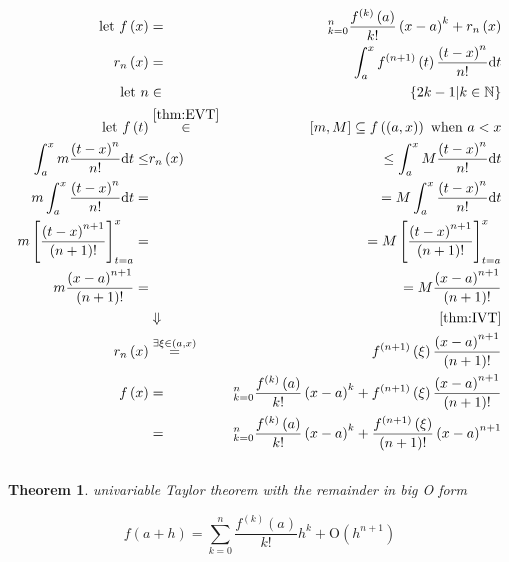 \documentclass[
]{book}
\newtheorem{theorem}{Theorem}[chapter]
\theoremstyle{definition}
\theoremstyle{definition}
\theoremstyle{definition}
\theoremstyle{definition}
\theoremstyle{remark}
\begin{document}
\begin{eqnarray}
\textrm{let }f\left(x\right) & = & \sum_{k=0}^{n}\frac{f^{\left(k\right)}\left(a\right)}{k!}\left(x-a\right)^{k}+r_{n}\left(x\right)\\
r_{n}\left(x\right) & = & \int_{a}^{x}f^{\left(n+1\right)}\left(t\right)\frac{\left(t-x\right)^{n}}{n!}\mathrm{d}t\\
\textrm{let }n & \in & \left\{ 2k-1|k\in\mathbb{N}\right\} \\
\textrm{let }f\left(t\right) & \overset{\ref{thm:EVT}}{\in} & \left[m,M\right]\subseteq f\left(\left(a,x\right)\right)\textrm{ when }a<x\\
\int_{a}^{x}m\frac{\left(t-x\right)^{n}}{n!}\mathrm{d}t\le & r_{n}\left(x\right) & \le\int_{a}^{x}M\frac{\left(t-x\right)^{n}}{n!}\mathrm{d}t\\
m\int_{a}^{x}\frac{\left(t-x\right)^{n}}{n!}\mathrm{d}t= &  & =M\int_{a}^{x}\frac{\left(t-x\right)^{n}}{n!}\mathrm{d}t\\
m\left[\frac{\left(t-x\right)^{n+1}}{\left(n+1\right)!}\right]_{t=a}^{x}= &  & =M\left[\frac{\left(t-x\right)^{n+1}}{\left(n+1\right)!}\right]_{t=a}^{x}\\
m\frac{\left(x-a\right)^{n+1}}{\left(n+1\right)!}= &  & =M\frac{\left(x-a\right)^{n+1}}{\left(n+1\right)!}\\
 & \Downarrow & \ref{thm:IVT}\\
r_{n}\left(x\right) & \overset{\exists\xi\in\left(a,x\right)}{=} & f^{\left(n+1\right)}\left(\xi\right)\frac{\left(x-a\right)^{n+1}}{\left(n+1\right)!}\\
f\left(x\right) & = & \sum_{k=0}^{n}\frac{f^{\left(k\right)}\left(a\right)}{k!}\left(x-a\right)^{k}+f^{\left(n+1\right)}\left(\xi\right)\frac{\left(x-a\right)^{n+1}}{\left(n+1\right)!}\\
 & = & \sum_{k=0}^{n}\frac{f^{\left(k\right)}\left(a\right)}{k!}\left(x-a\right)^{k}+\frac{f^{\left(n+1\right)}\left(\xi\right)}{\left(n+1\right)!}\left(x-a\right)^{n+1}
\end{eqnarray}

\[
\tag*{$\Box$}
\]

\begin{theorem}
\protect\hypertarget{thm:unnamed-chunk-6}{}\label{thm:unnamed-chunk-6}univariable Taylor theorem with the remainder in big O form
\end{theorem}

\[
f\left(a+h\right)=\sum_{k=0}^{n}\frac{f^{\left(k\right)}\left(a\right)}{k!}h^{k}+\mathrm{O}\left(h^{n+1}\right)
\]
\end{document}
